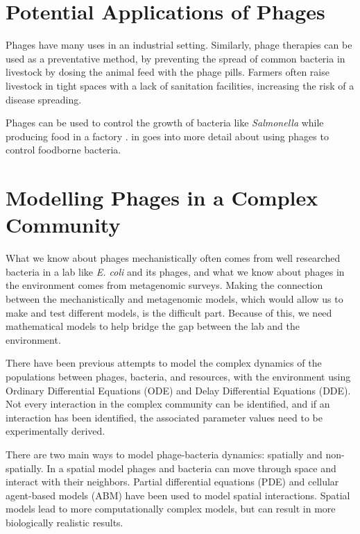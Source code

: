 \section{Potential Applications of Phages}
Phages have many uses in an industrial setting. 
Similarly, phage therapies can be used as a preventative method, by preventing the spread of common bacteria in livestock by dosing the animal feed with the phage pills. 
Farmers often raise livestock in tight spaces with a lack of sanitation facilities, increasing the risk of a disease spreading. 
 
Phages can be used to control the growth of bacteria like \textit{Salmonella} while producing food in a factory \cite{sofferBacteriophagesSafelyReduce2016, kowalskaFreshVegetablesFruit2023}. 
 in  goes into more detail about using phages to control foodborne bacteria. 

\section{Modelling Phages in a Complex Community}
What we know about phages mechanistically often comes from well researched bacteria in a lab like \textit{E. coli} and its phages, and what we know about phages in the environment comes from metagenomic surveys. 
Making the connection between the mechanistically and metagenomic models, which would allow us to make and test different models, is the difficult part. 
Because of this, we need mathematical models to help bridge the gap between the lab and the environment. 

There have been previous attempts to model the complex dynamics of the populations between phages, bacteria, and resources, with the environment using Ordinary Differential Equations (ODE) and Delay Differential Equations (DDE).
Not every interaction in the complex community can be identified, and if an interaction has been identified, the associated parameter values need to be experimentally derived. 

There are two main ways to model phage-bacteria dynamics: spatially and non-spatially.
In a spatial model phages and bacteria can move through space and interact with their neighbors. 
Partial differential equations (PDE) and cellular agent-based models (ABM) have been used to model spatial interactions.
Spatial models lead to more computationally complex models, but can result in more biologically realistic results. 

